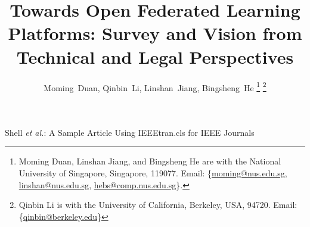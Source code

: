 \documentclass[journal]{IEEEtran}
\begin{document}
\title{Towards Open Federated Learning Platforms: Survey and Vision from Technical and Legal Perspectives}

\author{Moming~Duan,
        Qinbin~Li,
        Linshan~Jiang,
        Bingsheng~He%
\thanks{Moming Duan, Linshan Jiang, and Bingsheng He are with the National University of Singapore, Singapore, 119077. Email:  \{\href{mailto:moming@nus.edu.sg}{moming@nus.edu.sg}, \href{mailto:linshan@nus.edu.sg}{linshan@nus.edu.sg}, \href{mailto:hebs@comp.nus.edu.sg}{hebs@comp.nus.edu.sg}\}.}%
\thanks{Qinbin Li is with the University of California, Berkeley, USA, 94720. Email: \{\href{mailto:qinbin@berkeley.edu}{qinbin@berkeley.edu}\}}
}

%
{Shell \MakeLowercase{\textit{et al.}}: A Sample Article Using IEEEtran.cls for IEEE Journals}


\maketitle
\end{document}
